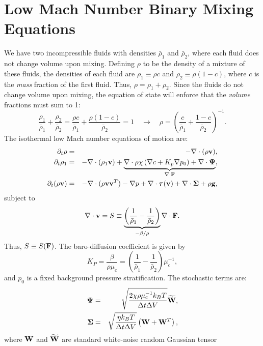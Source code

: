 \documentclass[final]{siamltex}
\def\Fb {{\bf F}}
\def\gb {{\bf g}}
\def\vb {{\bf v}}
\def\Wb {{\bf W}}
\def\Psib   {\boldsymbol{\Psi}}
\def\Sigmab {\boldsymbol{\Sigma}}
\def\taub   {\boldsymbol{\tau}}
\begin{document}
\section{Low Mach Number Binary Mixing Equations}
We have two incompressible fluids with densities $\bar\rho_1$ and $\bar\rho_2$, where 
each fluid does not change volume upon mixing.  Defining $\rho$ to be the density of
a mixture of these fluids, the densities of each fluid are $\rho_1 \equiv \rho c$ and 
$\rho_2 \equiv \rho(1-c)$, where $c$ is the {\it mass} fraction of the first fluid.  
Thus, $\rho = \rho_1 + \rho_2$.  Since the fluids do not change volume upon mixing, 
the equation of state will enforce that the {\it volume} fractions must sum to 1:
\begin{equation}
\frac{\rho_1}{\bar\rho_1} + \frac{\rho_2}{\bar\rho_2} =
\frac{\rho c}{\bar\rho_1} + \frac{\rho(1-c)}{\bar\rho_2} = 1 
\quad \rightarrow \quad
\rho = \left(\frac{c}{\bar\rho_1} + \frac{1-c}{\bar\rho_2}\right)^{-1}.
\end{equation}
The isothermal low Mach number equations of motion are:
\begin{eqnarray}
\partial_t\rho &=& -\nabla\cdot(\rho\vb),\\
\partial_t\rho_1 &=& -\nabla\cdot(\rho_1\vb) + \underbrace{\nabla\cdot\rho\chi\left(\nabla c + K_p\nabla p_0\right) + \nabla\cdot\Psib}_{\nabla\cdot\Fb},\\
\partial_t(\rho\vb) &=& -\nabla\cdot(\rho\vb\vb^T) - \nabla p + \nabla\cdot\taub(\vb) + \nabla\cdot\Sigmab + \rho\gb,
\end{eqnarray}
subject to
\begin{equation}
\nabla\cdot\vb = S \equiv \underbrace{\left(\frac{1}{\bar\rho_1}-\frac{1}{\bar\rho_2}\right)}_{-\beta/\rho}\nabla\cdot\Fb.
\end{equation}
Thus, $S \equiv S(\Fb)$.  The baro-diffusion coefficient is given by
\begin{equation}
K_P = \frac{\beta}{\rho\mu_c} = \left(\frac{1}{\bar\rho_1}-\frac{1}{\bar\rho_2}\right)\mu_c^{-1},
\end{equation}
and $p_0$ is a fixed background pressure stratification.  The stochastic terms are:
\begin{eqnarray}
\Psib &=& \sqrt{\frac{2\chi\rho\mu_c^{-1}k_BT}{\Delta t\Delta V}}\widetilde\Wb,\label{eq:rho1 stoch}\\
\Sigmab &=& \sqrt{\frac{\eta k_B T}{\Delta t\Delta V}}\left(\Wb + \Wb^T\right),\label{eq:mom stoch}
\end{eqnarray}
where $\Wb$ and $\widetilde\Wb$ are standard white-noise random Gaussian tensor
\end{document}
